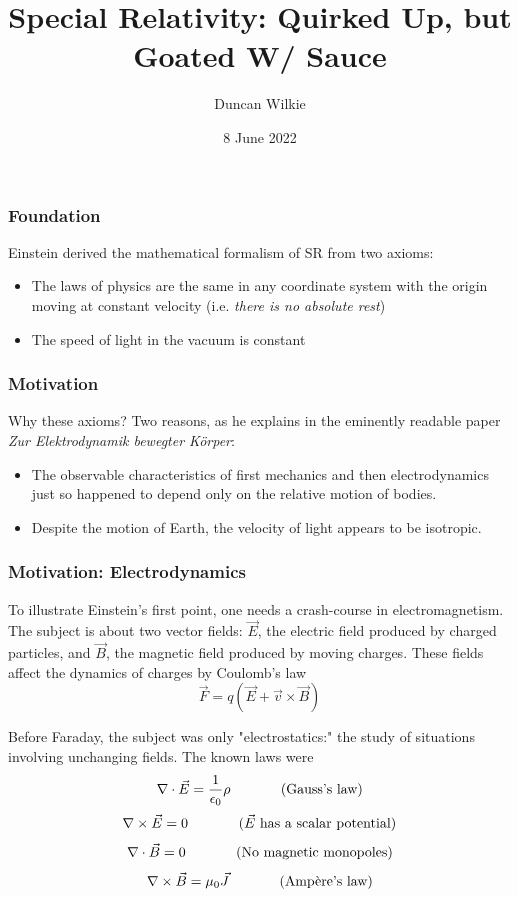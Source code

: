 \documentclass[10pt]{beamer}
\title{Special Relativity: Quirked Up, but Goated W/ Sauce}
\author{Duncan Wilkie}
\date{8 June 2022}
\begin{document}
\begin{frame}
  \titlepage
\end{frame}

\begin{frame}
  \frametitle{Foundation}
  Einstein derived the mathematical formalism of SR from two axioms:
  \begin{itemize}
  \item The laws of physics are the same in any coordinate system with the origin moving at constant velocity (i.e. \textit{there is no absolute rest})
  \item  The speed of light in the vacuum is constant
  \end{itemize}
\end{frame}

\begin{frame}
  \frametitle{Motivation}
  Why these axioms? Two reasons, as he explains in the eminently readable paper \textit{Zur Elektrodynamik bewegter Körper}:
  \begin{itemize}

  \item The observable characteristics of first mechanics and then electrodynamics just so happened to depend only on the relative motion of bodies.
  \item Despite the motion of Earth, the velocity of light appears to be isotropic.
  \end{itemize}
\end{frame}

\begin{frame}
  \frametitle{Motivation: Electrodynamics}
  To illustrate Einstein's first point, one needs a crash-course in electromagnetism.
  The subject is about two vector fields: $\vec{E}$, the electric field produced by charged particles, and $\vec{B}$, the magnetic field produced by moving charges.
  These fields affect the dynamics of charges by Coulomb's law
  \[
    \vec{F}= q(\vec{E}+\vec{v}\times\vec{B})
  \]

  Before Faraday, the subject was only "electrostatics:" the study of situations involving unchanging fields.
  The known laws were
  \[
    \nabla\cdot\vec{E} = \frac{1}{\epsilon_{0}}\rho \hspace{0.5in}  \textrm{(Gauss's law)}
  \]
  \[
    \nabla\times\vec{E}=0 \hspace{0.5in} \textrm{(}\vec{E}\textrm{ has a scalar potential)}
  \]
  \[
    \nabla \cdot \vec{B} = 0   \hspace{0.5in} \textrm{(No magnetic monopoles)}
  \]
  \[
    \nabla \times \vec{B} = \mu_{0}\vec{J} \hspace{0.5in} \textrm{(Amp\`ere's law)}
  \]
\end{frame}
\end{document}
